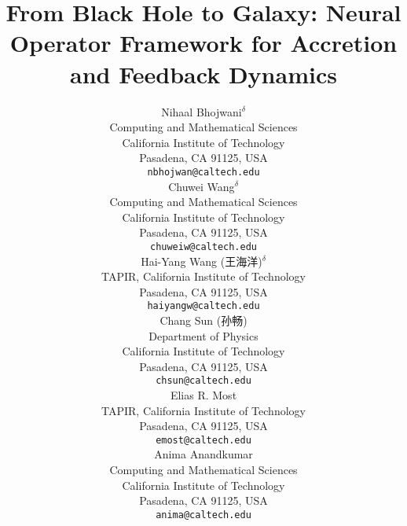 \documentclass{article}
\begin{document}
\begin{CJK*}{UTF8}{gbsn}
\title{From Black Hole to Galaxy: Neural Operator Framework for Accretion and Feedback Dynamics}

\author{%
  Nihaal Bhojwani$^{\delta}$ \\
  Computing and Mathematical Sciences\\
  California Institute of Technology\\
  Pasadena, CA 91125, USA \\
  \texttt{nbhojwan@caltech.edu} \\
  \And
  Chuwei Wang$^{\delta}$ \\
  Computing and Mathematical Sciences\\
  California Institute of Technology\\
  Pasadena, CA 91125,   USA \\
  \texttt{chuweiw@caltech.edu} \\
  \And
  Hai-Yang Wang (王海洋)$^{\delta}$ \\
  TAPIR, California Institute of Technology\\
  Pasadena, CA 91125, USA \\
  \texttt{haiyangw@caltech.edu} \\
  \And
  Chang Sun (孙畅) \\
  Department of Physics\\
  California Institute of Technology\\
  Pasadena, CA 91125, USA \\
  \texttt{chsun@caltech.edu} \\
  \And
  Elias R. Most \\
  TAPIR, California Institute of Technology\\
  Pasadena, CA 91125, USA \\
  \texttt{emost@caltech.edu} \\
  \And
  Anima Anandkumar \\
  Computing and Mathematical Sciences\\
  California Institute of Technology\\
  Pasadena, CA 91125, USA \\
  \texttt{anima@caltech.edu} \\
}

\maketitle


\end{CJK*}
\end{document}
